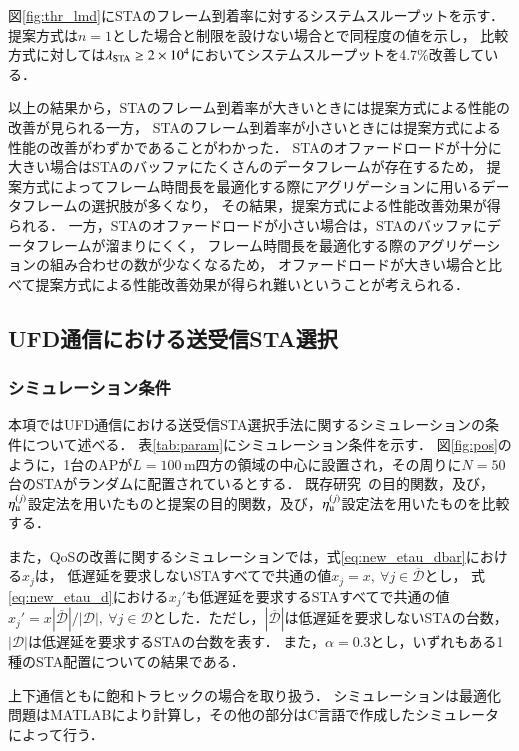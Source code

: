 \documentclass[master]{kuisthesis}		%
\newcommand{\etau}{\eta_{\rm u}^{(j)}}
\begin{document}
			図\ref{fig:thr_lmd}にSTAのフレーム到着率に対するシステムスループットを示す．
			提案方式は$n=1$とした場合と制限を設けない場合とで同程度の値を示し，
			比較方式に対しては$\lambda_{\rm STA} \geq 2 \times 10^{4}$においてシステムスループットを4.7\%改善している．
			\par
			以上の結果から，STAのフレーム到着率が大きいときには提案方式による性能の改善が見られる一方，
			STAのフレーム到着率が小さいときには提案方式による性能の改善がわずかであることがわかった．
			STAのオファードロードが十分に大きい場合はSTAのバッファにたくさんのデータフレームが存在するため，
			提案方式によってフレーム時間長を最適化する際にアグリゲーションに用いるデータフレームの選択肢が多くなり，
			その結果，提案方式による性能改善効果が得られる．
			一方，STAのオファードロードが小さい場合は，STAのバッファにデータフレームが溜まりにくく，
			フレーム時間長を最適化する際のアグリゲーションの組み合わせの数が少なくなるため，
			オファードロードが大きい場合と比べて提案方式による性能改善効果が得られ難いということが考えられる．

	\subsection{UFD通信における送受信STA選択}
		\subsubsection{シミュレーション条件}
			本項ではUFD通信における送受信STA選択手法に関するシミュレーションの条件について述べる．
			表\ref{tab:param}にシミュレーション条件を示す．
			図\ref{fig:pos}のように，1台のAPが$L=100$\,m四方の領域の中心に設置され，その周りに$N=50$台のSTAがランダムに配置されているとする．
			既存研究~\cite{promac}の目的関数，及び，$\etau$設定法を用いたものと提案の目的関数，及び，$\etau$設定法を用いたものを比較する．
			\par
			また，QoSの改善に関するシミュレーションでは，式\eqref{eq:new_etau_dbar}における$x_j$は，
			低遅延を要求しないSTAすべてで共通の値$x_j=x,\ \forall j\in {\overline {\mathcal D}}$とし，
			式\eqref{eq:new_etau_d}における$x_j'$も低遅延を要求するSTAすべてで共通の値$x_j'=x|{\overline {\mathcal D}}|/|{\mathcal D}|,\ \forall j \in {\mathcal D}$とした．ただし，$|{\overline {\mathcal D}}|$は低遅延を要求しないSTAの台数，
			$|{\mathcal D}|$は低遅延を要求するSTAの台数を表す．
			また，$\alpha=0.3$とし，いずれもある1種のSTA配置についての結果である．
			\par
			上下通信ともに飽和トラヒックの場合を取り扱う．
			シミュレーションは最適化問題はMATLABにより計算し，その他の部分はC言語で作成したシミュレータによって行う．
\end{document}
